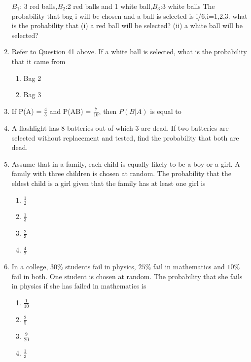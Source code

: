 \begin{enumerate}
$B_1$: 3 red balls,$B_2$:2 red balls and 1 white ball,$B_3$:3 white balls
The probability that bag i will be chosen and a ball is selected is i/6,i=1,2,3.
what is the probability that
(i) a red ball will be selected?     
(ii) a white ball will be selected?\\
\solution
%
\item Refer to Question 41 above. If a white ball is selected, what is the probability that it came from\\
\begin{enumerate}
\item  Bag 2
\item  Bag 3
\end{enumerate}
\solution
%
\item If P(A) = $\frac{4}{5}$ and P(AB) = $\frac{7}{10}$, then $P(B|A)$ is equal to\\
\solution
%
\item A flashlight has 8 batteries out of which 3 are dead. If two batteries are selected without replacement and tested, find the probability that both are dead.\\
%
\item Assume that in a family, each child is equally likely to be a boy or a girl. A family with three children is chosen at random. The probability that the eldest child is a girl given that the family has at least one girl is
\begin{enumerate}
\item $\frac{1}{2}$
\item $\frac{1}{3}$
\item $\frac{2}{3}$
\item $\frac{4}{7}$
\end{enumerate}
%
\item In a college, $30\%$ students fail in physics, $25\%$ fail in mathematics and $10\%$ fail in both. One student is chosen at random. The probability that she fails in physics if she has failed in mathematics is
\begin{enumerate}
    \item $\frac{1}{10}$
    \item $\frac{2}{5}$
    \item $\frac{9}{20}$
    \item $\frac{1}{3}$
\end{enumerate}
%
\end{enumerate}
